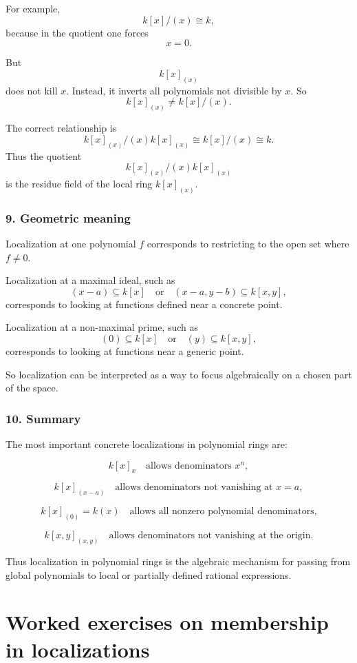 \documentclass[12pt,a4paper]{article}
\theoremstyle{notespace}
\theoremstyle{definition}
\begin{document}
For example,
\[
k[x]/(x)\cong k,
\]
because in the quotient one forces
\[
x=0.
\]

But
\[
k[x]_{(x)}
\]
does not kill \(x\). Instead, it inverts all polynomials not divisible by \(x\). So
\[
k[x]_{(x)}\neq k[x]/(x).
\]

The correct relationship is
\[
k[x]_{(x)}/(x)k[x]_{(x)}\cong k[x]/(x)\cong k.
\]
Thus the quotient
\[
k[x]_{(x)}/(x)k[x]_{(x)}
\]
is the residue field of the local ring \(k[x]_{(x)}\).

\subsubsection{9. Geometric meaning}

Localization at one polynomial \(f\) corresponds to restricting to the open set where \(f\neq 0\).

Localization at a maximal ideal, such as
\[
(x-a)\subseteq k[x]
\quad\text{or}\quad
(x-a,y-b)\subseteq k[x,y],
\]
corresponds to looking at functions defined near a concrete point.

Localization at a non-maximal prime, such as
\[
(0)\subseteq k[x]
\quad\text{or}\quad
(y)\subseteq k[x,y],
\]
corresponds to looking at functions near a generic point.

So localization can be interpreted as a way to focus algebraically on a chosen part of the space.

\subsubsection{10. Summary}

The most important concrete localizations in polynomial rings are:

\[
k[x]_x
\quad\text{allows denominators }x^n,
\]

\[
k[x]_{(x-a)}
\quad\text{allows denominators not vanishing at }x=a,
\]

\[
k[x]_{(0)}=k(x)
\quad\text{allows all nonzero polynomial denominators,}
\]

\[
k[x,y]_{(x,y)}
\quad\text{allows denominators not vanishing at the origin.}
\]

Thus localization in polynomial rings is the algebraic mechanism for passing from global polynomials to local or partially defined rational expressions.

\section{Worked exercises on membership in localizations}
\end{document}
